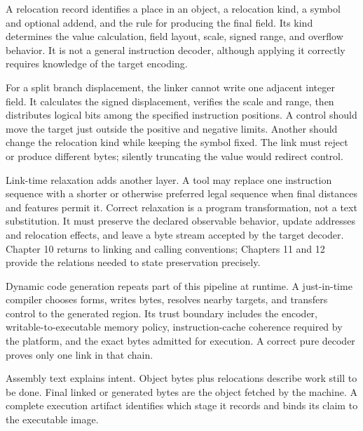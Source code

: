 \begin{definition}[title={Relocation is a typed patch obligation}]
A relocation record identifies a place in an object, a relocation kind, a
symbol and optional addend, and the rule for producing the final field. Its
kind determines the value calculation, field layout, scale, signed range, and
overflow behavior. It is not a general instruction decoder, although applying
it correctly requires knowledge of the target encoding.
\end{definition}

For a split branch displacement, the linker cannot write one adjacent integer
field. It calculates the signed displacement, verifies the scale and range,
then distributes logical bits among the specified instruction positions. A
control should move the target just outside the positive and negative limits.
Another should change the relocation kind while keeping the symbol fixed. The
link must reject or produce different bytes; silently truncating the value
would redirect control.

Link-time relaxation adds another layer. A tool may replace one instruction
sequence with a shorter or otherwise preferred legal sequence when final
distances and features permit it. Correct relaxation is a program
transformation, not a text substitution. It must preserve the declared
observable behavior, update addresses and relocation effects, and leave a byte
stream accepted by the target decoder. Chapter 10 returns to linking and
calling conventions; Chapters 11 and 12 provide the relations needed to state
preservation precisely.

Dynamic code generation repeats part of this pipeline at runtime. A
just-in-time compiler chooses forms, writes bytes, resolves nearby targets,
and transfers control to the generated region. Its trust boundary includes
the encoder, writable-to-executable memory policy, instruction-cache
coherence required by the platform, and the exact bytes admitted for
execution. A correct pure decoder proves only one link in that chain.

\begin{keyidea}[title={Bind evidence to final bytes}]
Assembly text explains intent. Object bytes plus relocations describe work
still to be done. Final linked or generated bytes are the object fetched by
the machine. A complete execution artifact identifies which stage it records
and binds its claim to the executable image.
\end{keyidea}

